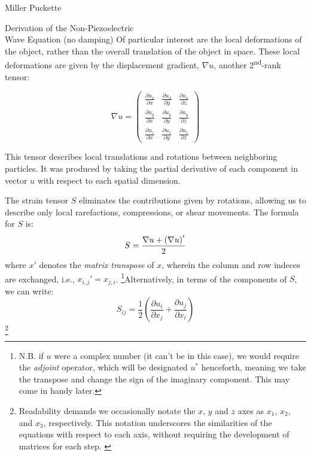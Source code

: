 \documentclass[a4paper,10pt]{report}
\numberwithin{equation}{section}
\begin{document}
\begin{chapter}{Miller Puckette}
\begin{section}{Derivation of the Non-Piezoelectric \\ Wave Equation (no damping)}
Of particular interest are the local deformations of the object, rather than the
overall translation of the object in space. These local deformations are given by the displacement gradient, $\nabla u$, another 2\textsuperscript{nd}-rank tensor\cite[p.~12]{Ballantine1997}:
\begin{singlespace}
\begin{equation*}\label{dispgrad}
\nabla u = \begin{pmatrix}
         \frac{\partial u_x}{\partial x} & \frac{\partial u_x}{\partial y} &
\frac{\partial u_x}{\partial z} \\[0.5em]
         \frac{\partial u_y}{\partial x} & \frac{\partial u_y}{\partial y} &
\frac{\partial u_y}{\partial z} \\[0.5em]
         \frac{\partial u_z}{\partial x} & \frac{\partial u_z}{\partial y} &
\frac{\partial u_z}{\partial z}
        \end{pmatrix}
\end{equation*}
\end{singlespace}
This tensor describes local translations and rotations between neighboring
particles. It was produced by taking the partial derivative of each component in vector $u$ with respect to each spatial dimension.

The strain tensor $S$ eliminates the contributions given by rotations, allowing us to describe only local rarefactions, compressions, or shear movements. The formula for $S$ is:
\begin{equation*}
S = \frac{\nabla u + \left(\nabla u \right)'}{2} \notag \\
\end{equation*}
where $x'$ denotes the \emph{matrix transpose} of $x$, wherein the column and row indeces are exchanged, i.e., $x_{i,j}' = x_{j,i}$. \footnote{N.B. if $u$ were a complex number (it can't be in this case), we would require the \emph{adjoint} operator, which will be designated $u^{*}$ henceforth, meaning we take the transpose and change the sign of the imaginary component. This may come in handy later. }Alternatively, in terms of the components of $S$, we can write\cite[p.~13]{Ballantine1997}:
\begin{equation}\label{strain}
S_{ij} = \frac{1}{2}\left(\frac{\partial u_i}{\partial x_j} + \frac{\partial
u_j}{\partial x_i}\right)
\end{equation}
\footnote{Readability demands we occasionally notate the $x$, $y$ and $z$ axes as $x_1$,
$x_2$, and $x_3$, respectively. This notation
underscores the similarities of the equations with respect to each axis, without
requiring the development of matrices for each step. \cite[p.~16]{Ballantine1997} \cite[p.~542]{Kino1987}}


\end{section}
\end{chapter}
\end{document}
